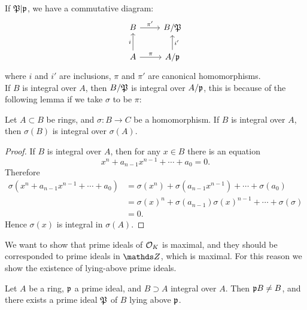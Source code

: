 			If $\mathfrak{P}|\mathfrak{p}$, we have a commutative diagram:
			\[
			\begin{tikzcd}
				B \arrow[r, "\pi'"]               & B/\mathfrak{P}                  \\
				A \arrow[r, "\pi"] \arrow[u, "i"] & A/\mathfrak{p} \arrow[u, "i'"']
			\end{tikzcd}
			\]
			where $i$ and $i'$ are inclusions, $\pi$ and $\pi'$ are canonical homomorphisms. \\
			If $B$ is integral over $A$, then $B/\mathfrak{P}$ is integral over $A/\mathfrak{p}$, this is because of the following lemma if we take $\sigma$ to be $\pi$:
			\begin{lemma}
				Let $A \subset B$ be rings, and $\sigma:B \to C$ be a homomorphism. If $B$ is integral over $A$, then $\sigma(B)$ is integral over $\sigma(A)$.
			\end{lemma}
			\begin{proof}
				If $B$ is integral over $A$, then for any $x \in B$ there is an equation
				\[
				x^n + a_{n-1}x^{n-1}+\cdots+a_0 = 0.
				\]
				Therefore
				\[
				\begin{aligned}
					\sigma(x^n+a_{n-1}x^{n-1}+\cdots+a_0) &= \sigma(x^n)+\sigma(a_{n-1}x^{n-1})+\cdots+\sigma(a_0) \\
					&= \sigma(x)^n + \sigma(a_{n-1})\sigma(x)^{n-1}+\cdots+\sigma(\sigma) \\
					&= 0.
				\end{aligned}
				\]
				Hence $\sigma(x)$ is integral in $\sigma(A)$.
			\end{proof}
			
			We want to show that prime ideals of $\mathcal{O}_K$ is maximal, and they should be corresponded to prime ideals in $\Z$, which is maximal. For this reason we show the existence of lying-above prime ideals.
			
			\begin{theorem}\label{lying-above}
				Let $A$ be a ring, $\mathfrak{p}$ a prime ideal, and $B \supset A$ integral over $A$. Then $\mathfrak{p}B \ne B$, and there exists a prime ideal $\mathfrak{P}$ of $B$ lying above $\mathfrak{p}$. 
			\end{theorem}
			
